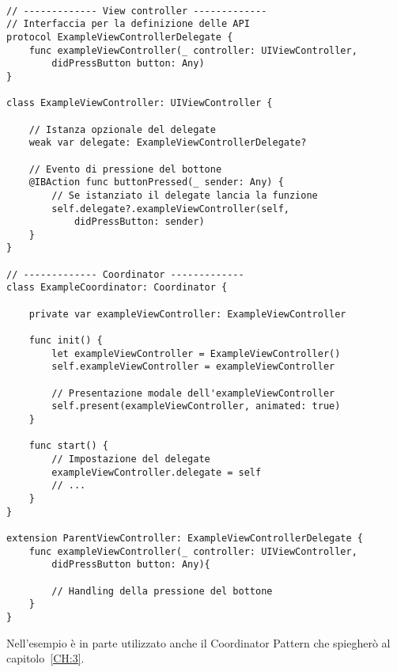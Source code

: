 \begin{verbatim}

// ------------- View controller -------------
// Interfaccia per la definizione delle API
protocol ExampleViewControllerDelegate {
    func exampleViewController(_ controller: UIViewController,
        didPressButton button: Any)
}

class ExampleViewController: UIViewController {

    // Istanza opzionale del delegate
    weak var delegate: ExampleViewControllerDelegate?

    // Evento di pressione del bottone
    @IBAction func buttonPressed(_ sender: Any) {
        // Se istanziato il delegate lancia la funzione
        self.delegate?.exampleViewController(self,
            didPressButton: sender)
    }
}

// ------------- Coordinator -------------
class ExampleCoordinator: Coordinator {

    private var exampleViewController: ExampleViewController

    func init() {
        let exampleViewController = ExampleViewController()
        self.exampleViewController = exampleViewController

        // Presentazione modale dell'exampleViewController
        self.present(exampleViewController, animated: true)
    }

    func start() {
        // Impostazione del delegate
        exampleViewController.delegate = self
        // ...
    }
}

extension ParentViewController: ExampleViewControllerDelegate {
    func exampleViewController(_ controller: UIViewController,
        didPressButton button: Any){
        
        // Handling della pressione del bottone
    }
}
\end{verbatim}

Nell'esempio è in parte utilizzato anche il Coordinator Pattern che spiegherò al capitolo~\ref{CH:3}.
